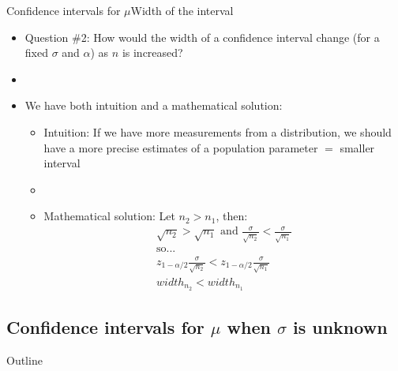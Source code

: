 \documentclass[xcolor=dvipsnames]{beamer}
\begin{document}
\begin{frame}{Confidence intervals for $\mu$}{Width of the interval}
	\begin{itemize}
		\item Question \#2: How would the width of a confidence interval change (for a fixed $\sigma$ and $\alpha$) as $n$ is increased?
		\item[]
		\item We have both intuition and a mathematical solution:
		\begin{itemize}
			\item Intuition: If we have more measurements from a distribution, we should have a more precise estimates of a population parameter $=$ smaller interval
			\item[]
			\item Mathematical solution: Let $n_2 > n_1$, then:
			\begin{gather*}
				\sqrt{n_2} > \sqrt{n_1} \text{ and } \frac{\sigma}{\sqrt{n_2}} < \frac{\sigma}{\sqrt{n_1}} \\
				\text{so...} \\
				z_{1-\alpha / 2} \frac{\sigma}{\sqrt{n_2}} < z_{1-\alpha / 2} \frac{\sigma}{\sqrt{n_1}} \\
				width_{n_2} < width_{n_1}
			\end{gather*}
		\end{itemize}
	\end{itemize}
\end{frame}

\subsection{Confidence intervals for $\mu$ when $\sigma$ is unknown}

\begin{frame}{Outline}
	\tableofcontents[currentsection,subsectionstyle=show/shaded/hide]
\end{frame}
\end{document}
